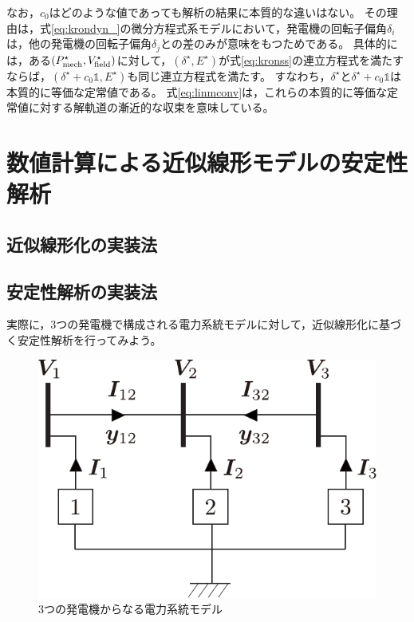 \documentclass[tombow,dvipdfmx]{corona-a5-1.1}
\begin{document}
なお，$c_0$はどのような値であっても解析の結果に本質的な違いはない。
その理由は，式\ref{eq:krondyn_}の微分方程式系モデルにおいて，発電機の回転子偏角$\delta_i$は，他の発電機の回転子偏角$\delta_j$との差のみが意味をもつためである。
具体的には，ある$(P_{{\rm mech}}^{\star},V_{{\rm field}}^{\star})$に対して，$(\delta^{\star},E^{\star})$が式\ref{eq:kronss}の連立方程式を満たすならば，$(\delta^{\star}+c_0 \mathds{1},E^{\star})$も同じ連立方程式を満たす。
すなわち，$\delta^{\star}$と$\delta^{\star}+c_0 \mathds{1}$は本質的に等価な定常値である。
式\ref{eq:linmconv}は，これらの本質的に等価な定常値に対する解軌道の漸近的な収束を意味している。


\section{数値計算による近似線形モデルの安定性解析}\label{sec:numlinsta}



\subsection{近似線形化の実装法}

\subsection{安定性解析の実装法}

実際に，3つの発電機で構成される電力系統モデルに対して，近似線形化に基づく安定性解析を行ってみよう。

\begin{figure}[t]
\centering
\includegraphics[width = .30\linewidth]{figs/3busex}
\caption{3つの発電機からなる電力系統モデル}
\label{fig:3genex}
\end{figure}
\end{document}

